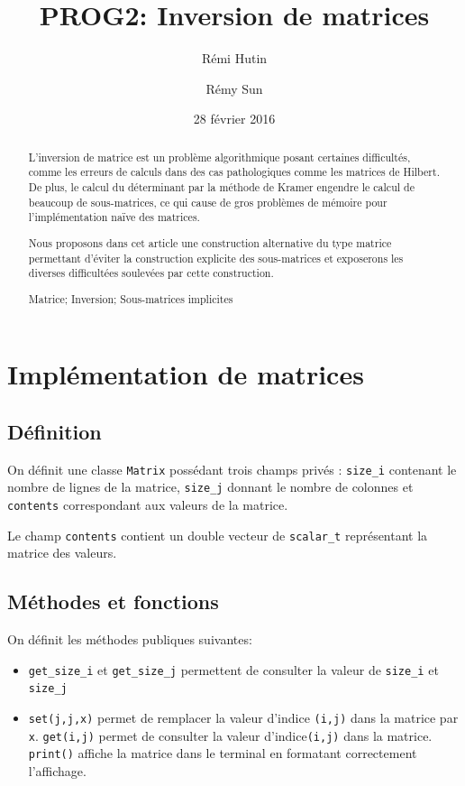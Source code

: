 \documentclass[a4paper,11pt]{article}
\title{PROG2: Inversion de matrices}
\author{Rémi Hutin \and Rémy Sun}
\date{28 février 2016}
\newenvironment{keywords}%
{\description\item[Mots-clés.]}%
{\enddescription}
\begin{document}
\maketitle

\begin{abstract}
  L'inversion de matrice est un problème algorithmique posant certaines difficultés, comme les erreurs de calculs dans des cas pathologiques comme les matrices de Hilbert.
  De plus, le calcul du déterminant par la méthode de Kramer engendre le calcul de beaucoup de sous-matrices, ce qui cause de gros problèmes de mémoire pour l'implémentation naïve des matrices.

  Nous proposons dans cet article une construction alternative du type matrice permettant d'éviter la construction explicite des sous-matrices et exposerons les diverses difficultées soulevées par cette construction.
  \begin{keywords}
    Matrice; Inversion; Sous-matrices implicites
  \end{keywords}
\end{abstract}

\section{Implémentation de matrices}

\subsection{Définition}

On définit une classe \texttt{Matrix} possédant trois champs privés : \texttt{size\_i} contenant le nombre de lignes de la matrice, \texttt{size\_j} donnant le nombre de colonnes et
 \texttt{contents} correspondant aux valeurs de la matrice.

Le champ  \texttt{contents}  contient un double vecteur de \texttt{scalar\_t} représentant la matrice des valeurs.

\subsection{Méthodes et fonctions}

On définit les méthodes publiques suivantes:

\begin{itemize}
\item \texttt{get\_size\_i} et \texttt{get\_size\_j} permettent de consulter la valeur de \texttt{size\_i} et \texttt{size\_j}
\item \texttt{set(j,j,x)} permet de remplacer la valeur d'indice \texttt{(i,j)} dans la matrice par \texttt{x}. \texttt{get(i,j)} permet de consulter la valeur d'indice\texttt{(i,j)} dans la matrice. \texttt{print()} affiche la matrice dans le terminal en formatant correctement l'affichage.
\end{itemize}
\end{document}
